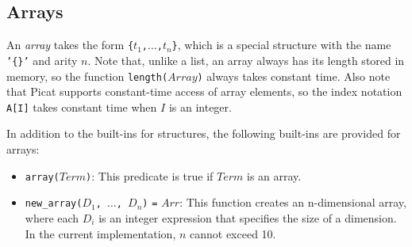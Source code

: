 \subsection{\label{subsec:arrays}Arrays}
An \emph{array} takes the form \texttt{\{$t_1$,$\ldots$,$t_{n}$\}}, which is a special structure with the name \texttt{'\{\}'} and arity $n$. Note that, unlike a list, an array always has its length stored in memory, so the function \texttt{length($Array$)} always takes constant time. Also note that Picat supports constant-time access of array elements, so the index notation \texttt{A[I]} takes constant time when $I$ is an integer. 

In addition to the built-ins for structures, the following built-ins are provided for arrays:
\begin{itemize}
\item \texttt{array($Term$)}: This predicate is true if $Term$ is an array.
\item \texttt{new\_array($D_1$, $\ldots$, $D_n$)} \texttt{=} \texttt{$Arr$}: This function creates an n-dimensional array, where each $D_i$ is an integer expression that specifies the size of a dimension. In the current implementation, $n$ cannot exceed 10.
\end{itemize}

